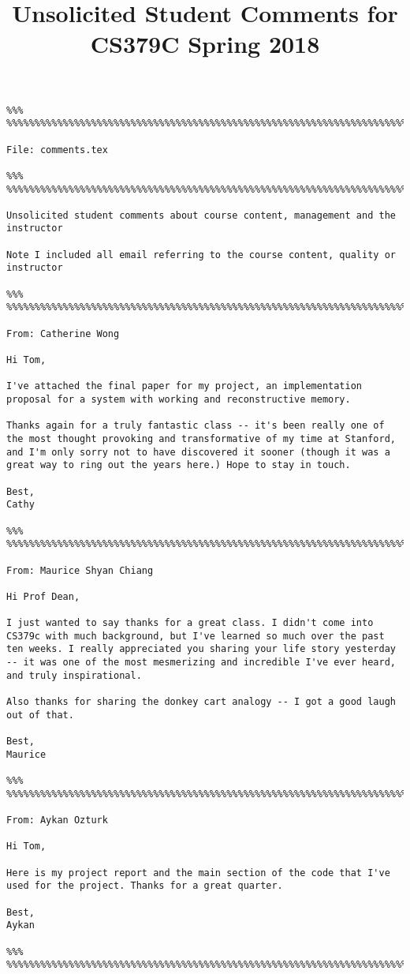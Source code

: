 \documentclass[letterpaper,12pt]{article}
\title{Unsolicited Student Comments for CS379C Spring 2018}
\date{}
\begin{document}
\begin{verbatim}
%%% %%%%%%%%%%%%%%%%%%%%%%%%%%%%%%%%%%%%%%%%%%%%%%%%%%%%%%%%%%%%%%%%%%%%%%%%%%%%

File: comments.tex

%%% %%%%%%%%%%%%%%%%%%%%%%%%%%%%%%%%%%%%%%%%%%%%%%%%%%%%%%%%%%%%%%%%%%%%%%%%%%%%

Unsolicited student comments about course content, management and the instructor

Note I included all email referring to the course content, quality or instructor

%%% %%%%%%%%%%%%%%%%%%%%%%%%%%%%%%%%%%%%%%%%%%%%%%%%%%%%%%%%%%%%%%%%%%%%%%%%%%%%

From: Catherine Wong

Hi Tom,

I've attached the final paper for my project, an implementation proposal for a system with working and reconstructive memory.

Thanks again for a truly fantastic class -- it's been really one of the most thought provoking and transformative of my time at Stanford, and I'm only sorry not to have discovered it sooner (though it was a great way to ring out the years here.) Hope to stay in touch.

Best,
Cathy

%%% %%%%%%%%%%%%%%%%%%%%%%%%%%%%%%%%%%%%%%%%%%%%%%%%%%%%%%%%%%%%%%%%%%%%%%%%%%%%

From: Maurice Shyan Chiang

Hi Prof Dean, 

I just wanted to say thanks for a great class. I didn't come into CS379c with much background, but I've learned so much over the past ten weeks. I really appreciated you sharing your life story yesterday -- it was one of the most mesmerizing and incredible I've ever heard, and truly inspirational. 

Also thanks for sharing the donkey cart analogy -- I got a good laugh out of that. 

Best, 
Maurice

%%% %%%%%%%%%%%%%%%%%%%%%%%%%%%%%%%%%%%%%%%%%%%%%%%%%%%%%%%%%%%%%%%%%%%%%%%%%%%%

From: Aykan Ozturk

Hi Tom,

Here is my project report and the main section of the code that I've used for the project. Thanks for a great quarter.

Best,
Aykan

%%% %%%%%%%%%%%%%%%%%%%%%%%%%%%%%%%%%%%%%%%%%%%%%%%%%%%%%%%%%%%%%%%%%%%%%%%%%%%%


\end{verbatim}
\end{document}
